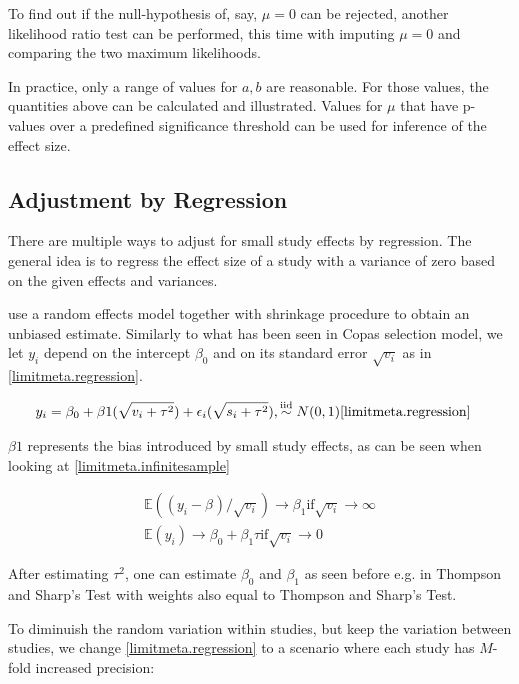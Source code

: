 \documentclass[11pt,a4paper,twoside]{book}\usepackage[]{graphicx}\usepackage[]{color}
\begin{document}
\vspace{0mm}
To find out if the null-hypothesis of, say, $\mu = 0$ can be rejected, another likelihood ratio test can be performed, this time with imputing $\mu = 0$ and comparing the two maximum likelihoods.

\vspace{0mm}
In practice, only a range of values for $a,b$ are reasonable. For those values, the quantities above can be calculated and illustrated. Values for $\mu$ that have p-values over a predefined significance threshold can be used for inference of the effect size. 

\subsection{Adjustment by Regression}
There are multiple ways to adjust for small study effects by regression. The general idea is to regress the effect size of a study with a variance of zero based on the given effects and variances. 

\citet{limitmeta} use a random effects model together with shrinkage procedure to obtain an unbiased estimate. Similarly to what has been seen in Copas selection model, we let $y_{i}$ depend on the intercept $\beta_{0}$ and on its standard error $\sqrt{v_{i}}$ as in \ref{limitmeta.regression}.

\begin{align}
y_{i}& = \beta_{0} + \beta{1}(\sqrt{v_{i} + \tau^2}) + \epsilon_{i}(\sqrt{s_{i} + \tau^2}), \stackrel{\textrm{iid}}{\sim} N(0,1)  \ref{limitmeta.regression}
\end{align}

$\beta{1}$ represents the bias introduced by small study effects, as can be seen when looking at \ref{limitmeta.infinitesample}

\begin{align}
\mathbb{E}((y_{i} - \beta_{})/\sqrt{v_{i}}) \rightarrow \beta_{1} \textrm{if} \sqrt{v_{i}} \rightarrow \infty \\
\mathbb{E}(y_{i}) \rightarrow \beta_{0} + \beta_{1}\tau \textrm{if} \sqrt{v_{i}} \rightarrow 0 
\end{align}

After estimating $\tau^2$, one can estimate $\beta_{0}$ and $\beta_{1}$ as seen before e.g. in Thompson and Sharp's Test with weights also equal to Thompson and Sharp's Test.

\vspace{0mm}
To diminuish the random variation within studies, but keep the variation between studies, we change \ref{limitmeta.regression} to a scenario where each study has $M$-fold increased precision:
\end{document}
